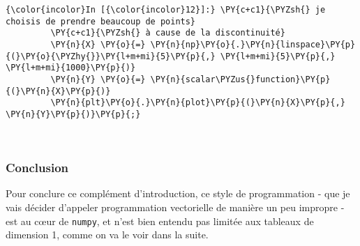     \begin{Verbatim}[commandchars=\\\{\}]
{\color{incolor}In [{\color{incolor}12}]:} \PY{c+c1}{\PYZsh{} je choisis de prendre beaucoup de points}
         \PY{c+c1}{\PYZsh{} à cause de la discontinuité}
         \PY{n}{X} \PY{o}{=} \PY{n}{np}\PY{o}{.}\PY{n}{linspace}\PY{p}{(}\PY{o}{\PYZhy{}}\PY{l+m+mi}{5}\PY{p}{,} \PY{l+m+mi}{5}\PY{p}{,} \PY{l+m+mi}{1000}\PY{p}{)}
         \PY{n}{Y} \PY{o}{=} \PY{n}{scalar\PYZus{}function}\PY{p}{(}\PY{n}{X}\PY{p}{)}
         \PY{n}{plt}\PY{o}{.}\PY{n}{plot}\PY{p}{(}\PY{n}{X}\PY{p}{,} \PY{n}{Y}\PY{p}{)}\PY{p}{;}
\end{Verbatim}


    \begin{center}
    \end{center}
    { \hspace*{\fill} \\}
    
    \hypertarget{conclusion}{%
\subsubsection{Conclusion}\label{conclusion}}

    Pour conclure ce complément d'introduction, ce style de programmation -
que je vais décider d'appeler programmation vectorielle de manière un
peu impropre - est au cœur de \texttt{numpy}, et n'est bien entendu pas
limitée aux tableaux de dimension 1, comme on va le voir dans la suite.


    
    
    
